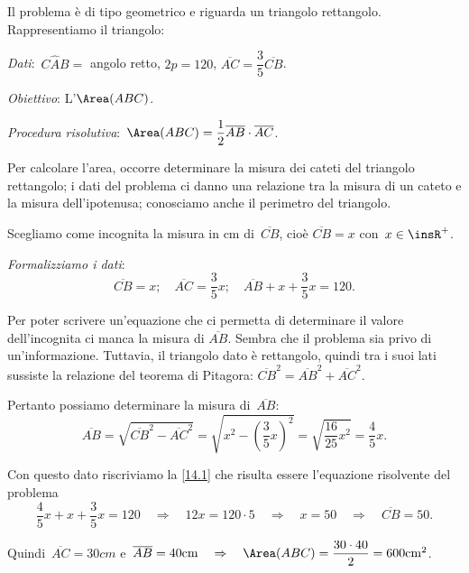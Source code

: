 \begin{soluzione}
 Il problema è di tipo geometrico e riguarda un triangolo rettangolo.
Rappresentiamo il triangolo:

\begin{multicols}{2}

\emph{Dati}:~$C\hat{A}B=$ angolo retto, $2p= 120$, $\overline{AC}=\dfrac{3}{5}\overline{CB}$.

\emph{Obiettivo}: L'$\Area (ABC)$.
\begin{center}
 
\end{center}
\end{multicols}



\emph{Procedura risolutiva}:~$\Area (ABC) =\dfrac{1}{2}\overline{AB}\cdot \overline{AC}$.

Per calcolare l'area, occorre determinare la misura dei
cateti del triangolo rettangolo; i dati del problema ci danno una
relazione tra la misura di un cateto e la misura
dell'ipotenusa; conosciamo anche il perimetro del
triangolo.

Scegliamo come incognita la misura in cm di~$\overline{CB}$, cioè
$\overline{CB}=x$ con~$x\in\insR^{+}$.

\emph{Formalizziamo i dati}:
 \begin{equation}\label{14.1}
 \overline{CB} =x;\quad \overline{AC} =\dfrac{3}{5}x;\quad \overline{AB} +x+\dfrac{3}{5}x=120.
 \end{equation}


Per poter scrivere un'equazione che ci permetta di determinare il
valore dell'incognita ci manca la misura di $\overline{AB}$. Sembra
che il problema sia privo di un'informazione. Tuttavia, il triangolo
dato è rettangolo, quindi tra i suoi lati sussiste la relazione del
teorema di Pitagora:
$\overline {CB}^{2}=\overline {AB}^{2}+\overline {AC}^{2}$.

Pertanto possiamo determinare la misura di~$\overline{AB}$:
\[\overline{AB}=\sqrt{\overline{CB}^{2}-\overline {AC}^{2}}=\sqrt{x^{2}-\left(\frac{3}{5}x\right)^{2}}=\sqrt{\frac{16}{25}x^{2}}=\frac{4}{5}x.\]

Con questo dato riscriviamo la \ref{14.1} che risulta essere
l'equazione risolvente del problema
\[\frac{4}{5}x+x+\dfrac{3}{5}x=120\quad\Rightarrow\quad 12x=120\cdot 5\quad\Rightarrow\quad x=50\quad\Rightarrow\quad\overline{CB}=50.\]

Quindi~$\overline {AC} = 30\unit{cm}$ e~$\overline {AB}= 40\unit{cm}\quad\Rightarrow\quad\Area (ABC)=\dfrac{30\cdot 40}{2}=600\unit{cm}^{2}$.
\end{soluzione}

\newpage

\cleardoublepage

